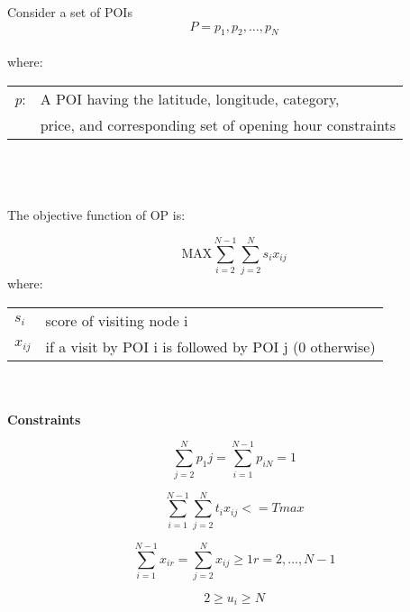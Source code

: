 


\setlength{\tabcolsep}{20pt}

Consider a set of POIs \[P = {p_1,p_2,\ldots,p_N}\]
\\
where:
\\

\begin{tabular}{l l}


\textit{p}:  &  A POI having the latitude, longitude, category,\\
 & price, and corresponding set of opening hour constraints \\
\end{tabular}
\\
\\
\\

The objective function of OP is:

\[ \text{MAX}  \sum_{i=2}^{N-1} \sum_{j=2}^{N} {s_i}{x_{ij}} \]
where:
\\
\begin{tabular}{l l}
\textit{$s_i$} & score of visiting node i \\
\textit{$x_{ij}$} & if a visit by POI i is followed by POI j (0 otherwise)\\

\end{tabular}
\\
\\

\textbf{Constraints} 

\begin{multicols}{2}
\begin{equation} 
    \label{constraintOne}
    \sum_{j=2}^{N} p_1j = \sum_{i=1}^{N-1} p_{iN}= 1
\end{equation}

\begin{equation} 
    \label{constraintTwo}
    \sum_{i=1}^{N-1} \sum_{j=2}^{N} t_{i}x_{ij}<= Tmax
\end{equation}


\end{multicols}

\begin{multicols}{2}

\begin{equation} 
    \label{constraintThree}
    \sum_{i=1}^{N-1} x_{ir} = \sum_{j=2}^{N} x_{ij} \geq 1  r = 2, \ldots, N-1
\end{equation}

\begin{equation} 
    \label{constraintFour}
    2 \geq u_i \geq N 
\end{equation}
\end{multicols}

